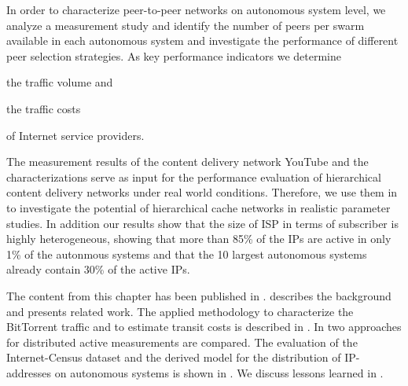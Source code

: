 In order to characterize peer-to-peer networks on autonomous system level,
we analyze a measurement study and identify the number of peers per swarm available in each autonomous system and investigate the performance of different peer selection strategies.
As key performance indicators we determine
\begin{enumerate*}
\item the traffic volume and
\item the traffic costs
\end{enumerate*}
of Internet service providers.


The measurement results of the content delivery network YouTube and the characterizations serve as input for the performance evaluation of hierarchical content delivery networks under real world conditions.
Therefore, we use them in  to investigate the potential of hierarchical cache networks in realistic parameter studies.
In addition our results show that the size of ISP in terms of subscriber is highly heterogeneous, showing that more than 85\% of the IPs are active in only 1\% of the autonmous systems and that the 10 largest autonomous systems already contain 30\% of the active IPs.


The content from this chapter has been published in \cite{burger2012profit,burger2014vantage,burger2016hierarchical}.
 describes the background and presents related work.
The applied methodology to characterize the BitTorrent traffic and to estimate transit costs is described in .
In  two approaches for distributed active measurements are compared.
The evaluation of the Internet-Census dataset and the derived model for the distribution of IP-addresses on autonomous systems is shown in .
We discuss lessons learned in .






